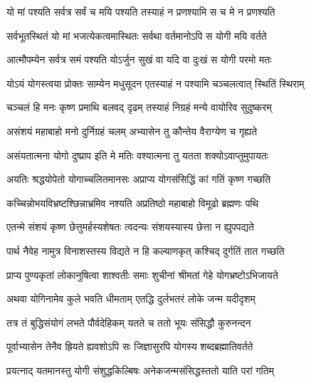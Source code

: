 \twolineshloka
{यो मां पश्यति सर्वत्र सर्वं च मयि पश्यति}
{तस्याहं न प्रणश्यामि स च मे न प्रणश्यति}%

\twolineshloka
{सर्वभूतस्थितं यो मां भजत्येकत्वमास्थितः}
{सर्वथा वर्तमानोऽपि स योगी मयि वर्तते}%

\twolineshloka
{आत्मौपम्येन सर्वत्र समं पश्यति योऽर्जुन}
{सुखं वा यदि वा दुःखं स योगी परमो मतः}%


\twolineshloka
{योऽयं योगस्त्वया प्रोक्तः साम्येन मधुसूदन}
{एतस्याहं न पश्यामि चञ्चलत्वात् स्थितिं स्थिराम्}%

\twolineshloka
{चञ्चलं हि मनः कृष्ण प्रमाथि बलवद् दृढम्}
{तस्याहं निग्रहं मन्ये वायोरिव सुदुष्करम्}%


\twolineshloka
{असंशयं महाबाहो मनो दुर्निग्रहं चलम्}
{अभ्यासेन तु कौन्तेय वैराग्येण च गृह्यते}%

\twolineshloka
{असंयतात्मना योगो दुष्प्राप इति मे मतिः}
{वश्यात्मना तु यतता शक्योऽवाप्तुमुपायतः}%


\twolineshloka
{अयतिः श्रद्धयोपेतो योगाच्चलितमानसः}
{अप्राप्य योगसंसिद्धिं कां गतिं कृष्ण गच्छति}%

\twolineshloka
{कच्चिन्नोभयविभ्रष्टश्छिन्नाभ्रमिव नश्यति}
{अप्रतिष्ठो महाबाहो विमूढो ब्रह्मणः पथि}%

\twolineshloka
{एतन्मे संशयं कृष्ण छेत्तुमर्हस्यशेषतः}
{त्वदन्यः संशयस्यास्य छेत्ता न ह्युपपद्यते}%


\twolineshloka
{पार्थ नैवेह नामुत्र विनाशस्तस्य विद्यते}
{न हि कल्याणकृत् कश्चिद् दुर्गतिं तात गच्छति}%

\twolineshloka
{प्राप्य पुण्यकृतां लोकानुषित्वा शाश्वतीः समाः}
{शुचीनां श्रीमतां गेहे योगभ्रष्टोऽभिजायते}%

\twolineshloka
{अथवा योगिनामेव कुले भवति धीमताम्}
{एतद्धि दुर्लभतरं लोके जन्म यदीदृशम्}%

\twolineshloka
{तत्र तं बुद्धिसंयोगं लभते पौर्वदेहिकम्}
{यतते च ततो भूयः संसिद्धौ कुरुनन्दन}%

\twolineshloka
{पूर्वाभ्यासेन तेनैव ह्रियते ह्यवशोऽपि सः}
{जिज्ञासुरपि योगस्य शब्दब्रह्मातिवर्तते}%

\twolineshloka
{प्रयत्नाद् यतमानस्तु योगी संशुद्धकिल्बिषः}
{अनेकजन्मसंसिद्धस्ततो याति परां गतिम्}%

